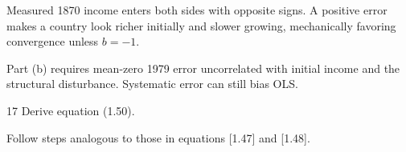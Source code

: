 \begin{note}
    Measured 1870 income enters both sides with opposite signs. A positive
    error makes a country look richer initially and slower growing, mechanically
    favoring convergence unless \(b=-1\).
\end{note}

\begin{note}
    Part (b) requires mean-zero 1979 error uncorrelated with initial income and
    the structural disturbance. Systematic error can still bias OLS.
\end{note}

\begin{problem}{17}
Derive equation (1.50).
\par {} Follow steps analogous to those in equations [1.47] and [1.48].
\end{problem}

